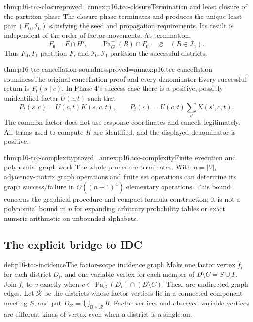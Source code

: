 \begin{hbtheorem}{thm:p16-tcc-closure}{proved=annex:p16.tcc-closure}{Termination and least closure of the partition phase}
The closure phase terminates and produces the unique least pair
\((F_0,\mathcal I_0)\) satisfying the seed and propagation requirements.
Its result is independent of the order of factor movements. At termination,
\[
 F_0=F\cap H',\qquad
 \operatorname{Pa}^{+}_G(B)\cap F_0=\varnothing
       \quad(B\in\mathcal I_1).
\]
Thus \(F_0,F_1\) partition \(F\), and
\(\mathcal I_0,\mathcal I_1\) partition the successful districts.
\end{hbtheorem}

\begin{hbtheorem}{thm:p16-tcc-cancellation-soundness}{proved=annex:p16.tcc-cancellation-soundness}{The original cancellation proof and every denominator}
Every successful return is \(P_t(s\mid c)\). In Phase 4's
success case there is a positive, possibly unidentified factor
\(U(c,t)\) such that
\[
 P_t(s,c)=U(c,t)K(s,c,t),\qquad
 P_t(c)=U(c,t)\sum_{s'}K(s',c,t).
\]
The common factor does not use response coordinates and cancels
legitimately. All terms used to compute \(K\) are identified,
and the displayed denominator is positive.
\end{hbtheorem}

\begin{hbtheorem}{thm:p16-tcc-complexity}{proved=annex:p16.tcc-complexity}{Finite execution and polynomial graph work}
The whole procedure terminates. With \(n=|V|\), adjacency-matrix
graph operations and finite set operations can determine its graph
success/failure in \(O((n+1)^4)\) elementary operations. This
bound concerns the graphical procedure and compact formula construction;
it is not a polynomial bound in \(n\) for expanding arbitrary
probability tables or exact numeric arithmetic on unbounded alphabets.
\end{hbtheorem}

\subsection{The explicit bridge to IDC}

\begin{hbdefinition}{def:p16-tcc-incidence}{The factor-scope incidence graph}
Make one factor vertex \(f_i\) for each district \(D_i\),
and one variable vertex for each member of \(D\setminus C=S\cup F\).
Join \(f_i\) to \(v\) exactly when
\(v\in\operatorname{Pa}^{+}_G(D_i)\cap(D\setminus C)\).
These are undirected graph edges. Let \(\mathcal R\) be the
districts whose factor vertices lie in a connected component meeting
\(S\), and put \(D_{\mathcal R}=\bigcup_{B\in\mathcal R}B\).
Factor vertices and observed variable vertices are different kinds of
vertex even when a district is a singleton.
\end{hbdefinition}

